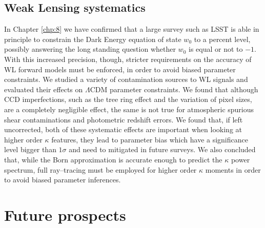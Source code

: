 \subsection{Weak Lensing systematics}
In Chapter \ref{chp:8} we have confirmed that a large survey such as LSST is able in principle to constrain the Dark Energy equation of state $w_0$ to a percent level, possibly answering the long standing question whether $w_0$ is equal or not to $-1$. With this increased precision, though, stricter requirements on the accuracy of WL forward models must be enforced, in order to avoid biased parameter constraints. We studied a variety of contamination sources to WL signals and evaluated their effects on $\Lambda$CDM parameter constraints. We found that although CCD imperfections, such as the tree ring effect and the variation of pixel sizes, are a completely negligible effect, the same is not true for atmospheric spurious shear contaminations and  photometric redshift errors. We found that, if left uncorrected, both of these systematic effects are important when looking at higher order $\kappa$ features, they lead to parameter bias which have a significance level bigger than $1\sigma$ and need to mitigated in future surveys. We also concluded that, while the Born approximation is accurate enough to predict the $\kappa$ power spectrum, full ray--tracing must be employed for higher order $\kappa$ moments in order to avoid biased parameter inferences.      

\section{Future prospects}


